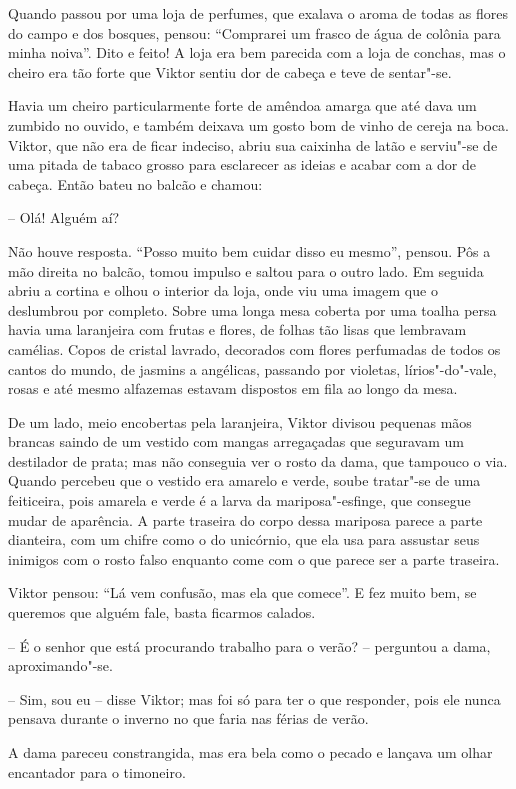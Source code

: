 Quando passou por uma loja de perfumes, que exalava o aroma de todas as
flores do campo e dos bosques, pensou: ``Comprarei um frasco de água
de colônia para minha noiva''. Dito e feito! A loja era bem parecida com
a loja de conchas, mas o cheiro era tão forte que Viktor sentiu dor de
cabeça e teve de sentar"-se. 

Havia um cheiro particularmente forte de amêndoa amarga que até dava 
um zumbido no ouvido, e também deixava um gosto bom de vinho de cereja na boca. 
Viktor, que não era de ficar indeciso, abriu sua caixinha de latão e 
serviu"-se de uma pitada de tabaco grosso para esclarecer as ideias e 
acabar com a dor de cabeça. Então bateu no balcão e chamou:

-- Olá! Alguém aí?

Não houve resposta. ``Posso muito bem cuidar disso eu mesmo'', pensou. Pôs
a mão direita no balcão, tomou impulso e saltou para o outro lado. Em
seguida abriu a cortina e olhou o interior da loja, onde viu uma imagem
que o deslumbrou por completo. Sobre uma longa mesa coberta por uma
toalha persa havia uma laranjeira com frutas e flores, de folhas tão
lisas que lembravam camélias. Copos de cristal lavrado, decorados com
flores perfumadas de todos os cantos do mundo, de jasmins a angélicas,
passando por violetas, lírios"-do"-vale, rosas e até mesmo alfazemas
estavam dispostos em fila ao longo da mesa. 

De um lado, meio encobertas
pela laranjeira, Viktor divisou pequenas mãos brancas saindo de um
vestido com mangas arregaçadas que seguravam um destilador de prata;
mas não conseguia ver o rosto da dama, que tampouco o via. Quando
percebeu que o vestido era amarelo e verde, soube tratar"-se de uma
feiticeira, pois amarela e verde é a larva da mariposa"-esfinge, que
consegue mudar de aparência. A parte traseira do corpo dessa mariposa
parece a parte dianteira, com um chifre como o do unicórnio, que ela
usa para assustar seus inimigos com o rosto falso enquanto come com o
que parece ser a parte traseira.

Viktor pensou: ``Lá vem confusão, mas ela que comece''. E fez muito bem,
se queremos que alguém fale, basta ficarmos calados.

-- É o senhor que está procurando trabalho para o verão? -- perguntou a
dama, aproximando"-se.

 -- Sim, sou eu -- disse Viktor; mas foi só para ter o que responder, pois
ele nunca pensava durante o inverno no que faria nas férias de verão. 

 A dama pareceu constrangida, mas era bela como o pecado e lançava um
olhar encantador para o timoneiro.

